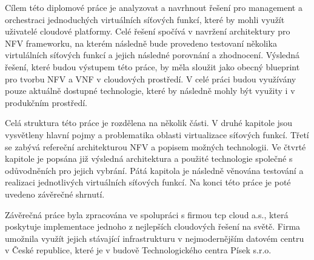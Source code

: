 Cílem této diplomové práce je analyzovat a navrhnout řešení pro management a orchestraci jednoduchých virtuálních síťových funkcí, které by mohli využít uživatelé cloudové platformy. Celé řešení spočívá v navržení architektury pro NFV frameworku, na kterém následně bude provedeno testovaní několika virtulálních síťových funkcí a jejich následné porovnání a zhodnocení. Výsledná řešení, které budou výstupem této práce, by měla sloužit jako obecný blueprint pro tvorbu NFV a VNF v cloudových prostředí. V celé práci budou využívány pouze aktuálně dostupné technologie, které by následně mohly být využity i v produkčním prostředí.

Celá struktura této práce je rozdělena na několik části. V druhé kapitole jsou vysvětleny hlavní pojmy a problematika oblasti virtualizace síťových funkcí. Třetí se zabývá refereční architekturou NFV a popisem možných technologii. Ve čtvrté kapitole je popsána již výsledná architektura a použité technologie společné s odůvodněních pro jejich vybrání. Pátá kapitola je následně věnována testování a realizaci jednotlivých virtuálních síťových funkcí. Na konci této práce je poté uvedeno závěrečné shrnutí.

Závěrečná práce byla zpracována ve spolupráci s firmou tcp cloud a.s., která poskytuje implementace jednoho z nejlepších cloudových řešení na světě. Firma umožnila využít jejich stávající infrastrukturu v nejmodernějším datovém centru v České republice, které je v budově Technologického centra Písek s.r.o.